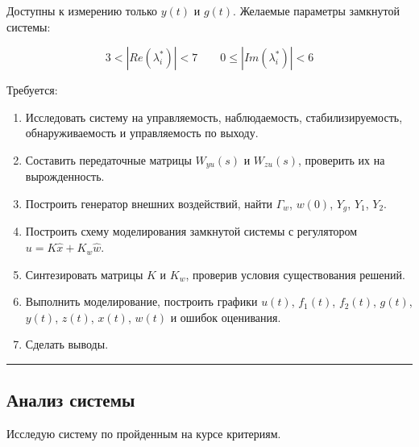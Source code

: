\documentclass[a4paper,12pt]{article}
\begin{document}
	Доступны к измерению только $y(t)$ и $g(t)$. Желаемые параметры замкнутой системы:
	
	\[
	3 < |Re(\lambda_i^*)| < 7 \qquad 0 \leq |Im(\lambda_i^*)| < 6
	\]
	
	Требуется:
	
	\begin{enumerate}
		\item Исследовать систему на управляемость, наблюдаемость, стабилизируемость, обнаруживаемость и управляемость по выходу.
		
		\item Составить передаточные матрицы $W_{yu}(s)$ и $W_{zu}(s)$, проверить их на вырожденность.
		
		\item Построить генератор внешних воздействий, найти $\Gamma_w$, $w(0)$, $Y_g$, $Y_1$, $Y_2$.
		
		\item Построить схему моделирования замкнутой системы с регулятором $u = K\hat{x} + K_w\hat{w}$.
		
		\item Синтезировать матрицы $K$ и $K_w$, проверив условия существования решений.
		
		\item Выполнить моделирование, построить графики $u(t)$, $f_1(t)$, $f_2(t)$, $g(t)$, $y(t)$, $z(t)$, $x(t)$, $w(t)$ и ошибок оценивания.
		
		\item Сделать выводы.
	\end{enumerate}
	
	\hrule \newpage
	
	\subsection{Анализ системы}
	
	Исследую систему по пройденным на курсе критериям.
	
\end{document}
